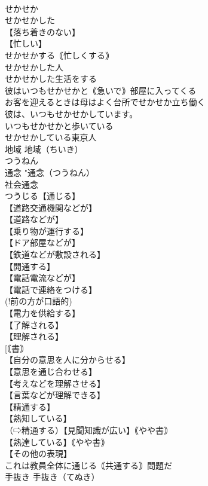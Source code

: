 \documentclass[8pt]{extreport}
\begin{document}
\begin{CJK}{UTF8}{min}
\\	せかせか
\\	せかせかした
\\	【落ち着きのない】
\\	【忙しい】
\\	せかせかする｟忙しくする｠
\\	せかせかした人
\\	せかせかした生活をする
\\	彼はいつもせかせかと｟急いで｠部屋に入ってくる
\\	お客を迎えるときは母はよく台所でせかせか立ち働く
\\	彼は、いつもせかせかしています。
\\	いつもせかせかと歩いている
\\	せかせかしている東京人
\\	地域		地域（ちいき）
\\	つうねん
\\	通念		"通念（つうねん）
\\	社会通念
\\	つうじる【通じる】
\\	【道路交通機関などが】
\\	【道路などが】
\\	【乗り物が運行する】
\\	【ドア部屋などが】
\\	【鉄道などが敷設される】
\\	【開通する】
\\	【電話電流などが】
\\	【電話で連絡をつける】
\\	(!前の方が口語的) 
\\	【電力を供給する】
\\	【了解される】
\\	【理解される】
\\	[｟書｠ 
\\	【自分の意思を人に分からせる】
\\	【意思を通じ合わせる】
\\	【考えなどを理解させる】
\\	【言葉などが理解できる】
\\	【精通する】
\\	【熟知している】
\\	（⇨精通する）【見聞知識が広い】｟やや書｠
\\	【熟達している】｟やや書｠
\\	【その他の表現】
\\	これは教員全体に通じる｟共通する｠問題だ
\\	手抜き		手抜き（てぬき）

\end{CJK}
\end{document}
